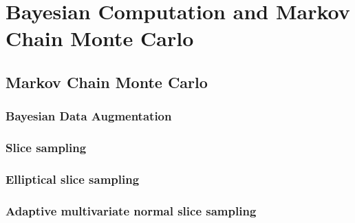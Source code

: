 \section{Bayesian Computation and Markov Chain Monte Carlo}
\label{sec:bayesian_computation}

\subsection{Markov Chain Monte Carlo}
\label{subsec:mcmc}

\subsubsection{Bayesian Data Augmentation}
\label{subsec:data_augmentation}

\subsubsection{Slice sampling}
\label{subsubsec:slice_sampling}

\subsubsection{Elliptical slice sampling}
\label{subsubsec:elliptical_slice_sampling}

\subsubsection{Adaptive multivariate normal slice sampling}
\label{subsubsec:mvn_slice_sampling}